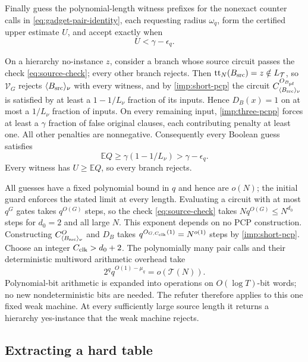 \documentclass[11pt,letterpaper]{article}
\theoremstyle{definition}
\theoremstyle{remark}
\newcommand{\Tclk}{\mathcal T}
\begin{document}
Finally guess the polynomial-length witness prefixes for the nonexact
counter calls in \cref{eq:gadget-pair-identity}, each requesting
radius $\omega_q$, form the certified upper
estimate $U$, and accept exactly when
\begin{equation}\label{eq:gadget-acceptance}
 U<\gamma-\epsilon_q.
\end{equation}

On a hierarchy no-instance $z$, consider a branch whose source circuit
passes the check \eqref{eq:source-check}; every other branch rejects.
Then $\mathrm{tt}_N(B_{\rm src})=z\notin L_{\Tclk}$, so $\mathcal V_G$
rejects $\langle B_{\rm src}\rangle_\nu$ with every witness, and by
\cref{imp:short-pcp} the circuit
$C^{O_{B_{\rm pf}}}_{\langle B_{\rm src}\rangle_\nu}$ is satisfied by at
least a $1-1/L_\nu$ fraction of its inputs. Hence $D_B(x)=1$
on at most a $1/L_\nu$ fraction of inputs. On every remaining
input, \cref{imp:three-pcpp} forces at least a $\gamma$ fraction
of false original clauses, each contributing penalty at least one.
All other penalties are nonnegative. Consequently every Boolean
guess satisfies
\[
 \mathbb E Q\ge\gamma(1-1/L_\nu)>\gamma-\epsilon_q.
\]
Every witness has $U\ge\mathbb E Q$, so every branch rejects.

All guesses have a fixed polynomial bound in $q$ and hence are
$o(N)$; the initial guard enforces the stated limit at every length.
Evaluating a circuit with at most $q^G$ gates takes $q^{O(G)}$ steps,
so the check \eqref{eq:source-check} takes $Nq^{O(G)}\le N^{d_0}$ steps
for $d_0=2$ and all large $N$. This exponent depends on no PCP
construction. Constructing $C^O_{\langle B_{\rm src}\rangle_\nu}$ and
$D_B$ takes $q^{O_{G,C_{\rm clk}}(1)}=N^{o(1)}$ steps by \cref{imp:short-pcp}. Choose an integer
$C_{\rm clk}>d_0+2$. The polynomially many
pair calls and their deterministic multiword arithmetic overhead
take
\[
 2^q q^{O(1)-\mu_q}=o(\Tclk(N)).
\]
Polynomial-bit arithmetic is expanded into operations on
$O(\log T)$-bit words; no new nondeterministic bits are needed.
The refuter therefore applies to this one fixed weak machine. At
every sufficiently large source length it returns a hierarchy
yes-instance that the weak machine rejects.

\subsection{Extracting a hard table}
\label{sec:gadget-extract}
\end{document}

